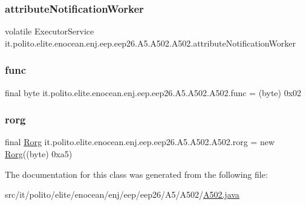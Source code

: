\subsubsection{\texorpdfstring{attribute\+Notification\+Worker}{attributeNotificationWorker}}
{\footnotesize\ttfamily volatile Executor\+Service it.\+polito.\+elite.\+enocean.\+enj.\+eep.\+eep26.\+A5.\+A502.\+A502.\+attribute\+Notification\+Worker\hspace{0.3cm}{\ttfamily [protected]}}

\hypertarget{classit_1_1polito_1_1elite_1_1enocean_1_1enj_1_1eep_1_1eep26_1_1_a5_1_1_a502_1_1_a502_a2cd5818d6e738f68dd21890636d8f26e}{}\label{classit_1_1polito_1_1elite_1_1enocean_1_1enj_1_1eep_1_1eep26_1_1_a5_1_1_a502_1_1_a502_a2cd5818d6e738f68dd21890636d8f26e} 
\subsubsection{\texorpdfstring{func}{func}}
{\footnotesize\ttfamily final byte it.\+polito.\+elite.\+enocean.\+enj.\+eep.\+eep26.\+A5.\+A502.\+A502.\+func = (byte) 0x02\hspace{0.3cm}{\ttfamily [static]}}

\hypertarget{classit_1_1polito_1_1elite_1_1enocean_1_1enj_1_1eep_1_1eep26_1_1_a5_1_1_a502_1_1_a502_af5b131f4f623e17ac161ed4e9c4b4d05}{}\label{classit_1_1polito_1_1elite_1_1enocean_1_1enj_1_1eep_1_1eep26_1_1_a5_1_1_a502_1_1_a502_af5b131f4f623e17ac161ed4e9c4b4d05} 
\subsubsection{\texorpdfstring{rorg}{rorg}}
{\footnotesize\ttfamily final \hyperlink{classit_1_1polito_1_1elite_1_1enocean_1_1enj_1_1eep_1_1_rorg}{Rorg} it.\+polito.\+elite.\+enocean.\+enj.\+eep.\+eep26.\+A5.\+A502.\+A502.\+rorg = new \hyperlink{classit_1_1polito_1_1elite_1_1enocean_1_1enj_1_1eep_1_1_rorg}{Rorg}((byte) 0xa5)\hspace{0.3cm}{\ttfamily [static]}}



The documentation for this class was generated from the following file\+:\begin{DoxyCompactItemize}
\item 
src/it/polito/elite/enocean/enj/eep/eep26/\+A5/\+A502/\hyperlink{_a502_8java}{A502.\+java}\end{DoxyCompactItemize}

